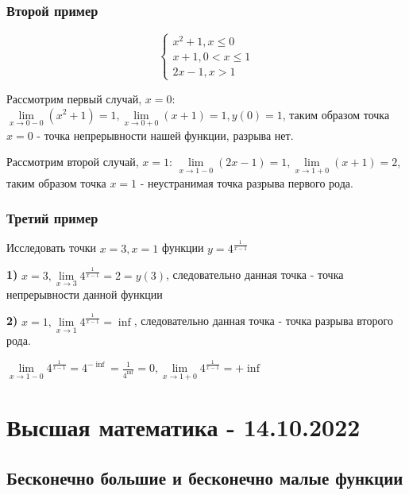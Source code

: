 \documentclass{article}
\begin{document}
\subsubsection{Второй пример}

\begin{equation}
    \begin{cases}
        x^2 + 1, x \le 0 \\
        x + 1, 0 < x \le 1 \\
        2x - 1, x > 1
    \end{cases}
\end{equation}

Рассмотрим первый случай, $x = 0$: $\lim\limits_{x \to 0 - 0} (x^2 + 1) = 1, \lim\limits_{x \to 0 + 0} (x + 1) = 1, y(0) = 1$, таким образом точка $x = 0$ - точка непрерывности нашей функции, разрыва нет.

Рассмотрим второй случай, $x = 1$: $\lim\limits_{x \to 1 - 0} (2x - 1) = 1, \lim\limits_{x \to 1 + 0} (x + 1) = 2$, таким образом точка $x = 1$ - неустранимая точка разрыва первого рода.

\subsubsection{Третий пример}

Исследовать точки $x = 3, x = 1$ функции $y = 4^\frac{1}{x - 1}$

\textbf{1)} $x = 3, \lim\limits_{x \to 3} 4^\frac{1}{x - 1} = 2 = y(3)$, следовательно данная точка - точка непрерывности данной функции

\textbf{2)} $x = 1, \lim\limits_{x \to 1} 4^\frac{1}{x - 1} = \inf$, следовательно данная точка - точка разрыва второго рода.

$\lim\limits_{x \to 1 - 0} 4^{\frac{1}{x - 1}} = 4^{-\inf} = \frac{1}{4^{\inf}} = 0, \lim\limits_{x \to 1 + 0} 4^\frac{1}{x - 1} = +\inf$

\pagebreak
\section{Высшая математика - 14.10.2022}

\subsection{Бесконечно большие и бесконечно малые функции}
\end{document}
